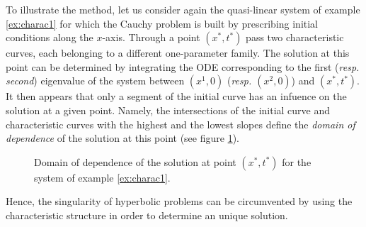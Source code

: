 To illustrate the method, let us consider again the quasi-linear system of example \ref{ex:charac1} for which the Cauchy problem is built by prescribing initial conditions along the $x$-axis. Through a point $(x^*,t^*)$ pass two characteristic curves, each belonging to a different one-parameter family. The solution at this point can be determined by integrating the ODE corresponding to the first (\textit{resp. second}) eigenvalue of the system between $(x^1,0)$ (\textit{resp. $(x^2,0)$}) and $(x^*,t^*)$. It then appears that only a segment of the initial curve has an infuence on the solution at a given point. Namely, the intersections of the initial curve and characteristic curves with the highest and the lowest slopes define the \textit{domain of dependence} of the solution at this point (see figure \ref{fig:charac_method2x2}). 
\begin{figure}[h]
  \centering
  
  \caption{Domain of dependence of the solution at point $(x^*,t^*)$ for the system of example \ref{ex:charac1}.}
  \label{fig:charac_method2x2}
\end{figure}

Hence, the singularity of hyperbolic problems can be circumvented by using the characteristic structure in order to determine an unique solution.


